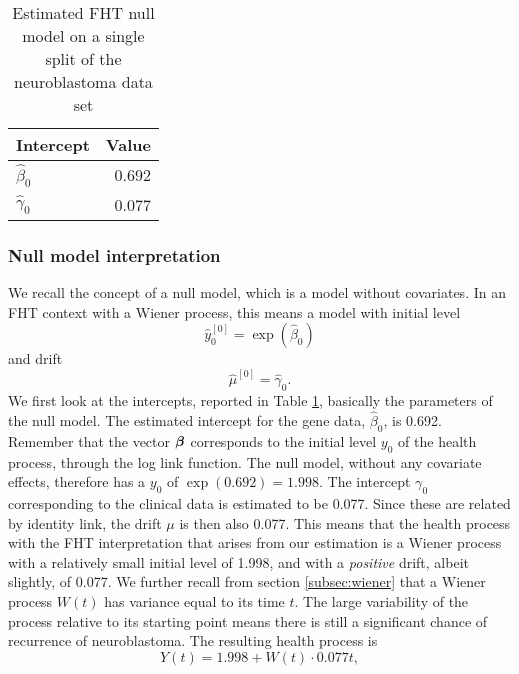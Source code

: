 \begin{table}
\caption{Estimated FHT null model on a single split of the neuroblastoma data set \citep{oberthuer-data}}
\label{tab:neuroblastoma-intercepts}
\centering
\begin{tabular}{lr}
\toprule
Intercept  & Value\\
\hline
$\hat{\beta}_0$ & 0.692 \\
$\hat{\gamma}_0$ & 0.077 \\
\bottomrule
\end{tabular}
\end{table}

\subsubsection{Null model interpretation}
We recall the concept of a null model, which is a model without covariates.
In an FHT context with a Wiener process, this means a model with initial level
\begin{equation*}
    \hat{y}_0^{[0]}=\exp\left(\hat{\beta}_0\right)
\end{equation*}
and drift
\begin{equation*}
    \hat{\mu}^{[0]}=\hat{\gamma}_0.
\end{equation*}
We first look at the intercepts, reported in Table \ref{tab:neuroblastoma-intercepts}, basically the parameters of the null model.
The estimated intercept for the gene data, $\hat{\beta}_0$, is 0.692.
Remember that the vector $\boldsymbol{\beta}$ corresponds to the initial level $y_0$ of the health process, through the log link function.
The null model, without any covariate effects, therefore has a $y_0$ of $\exp(0.692)=1.998$.
The intercept $\gamma_0$ corresponding to the clinical data is estimated to be 0.077.
Since these are related by identity link, the drift $\mu$ is then also 0.077.
This means that the health process with the FHT interpretation that arises from our estimation is a Wiener process with a relatively small initial level of 1.998, and with a \textit{positive} drift, albeit slightly, of 0.077.
We further recall from section \ref{subsec:wiener} that a Wiener process $W(t)$ has variance equal to its time $t$.
The large variability of the process relative to its starting point means there is still a significant chance of recurrence of neuroblastoma.
The resulting health process is
\begin{equation*}
    Y(t)=1.998+W(t)\cdot0.077t,
\end{equation*}

